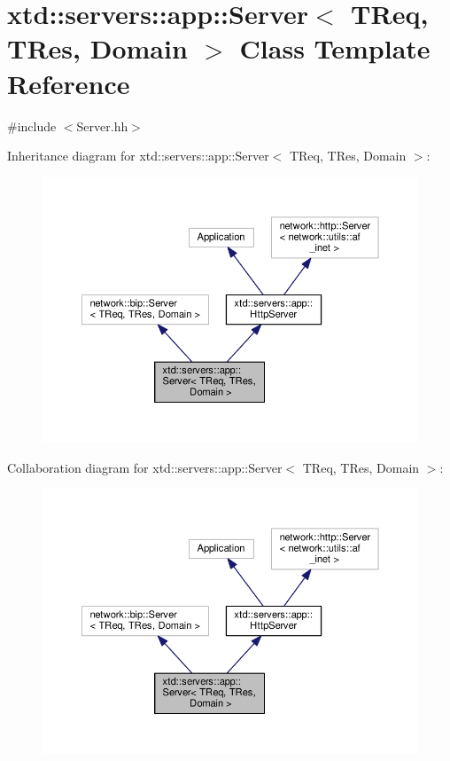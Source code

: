 \hypertarget{classxtd_1_1servers_1_1app_1_1Server}{\section{xtd\-:\-:servers\-:\-:app\-:\-:Server$<$ T\-Req, T\-Res, Domain $>$ Class Template Reference}
\label{classxtd_1_1servers_1_1app_1_1Server}
}


{\ttfamily \#include $<$Server.\-hh$>$}



Inheritance diagram for xtd\-:\-:servers\-:\-:app\-:\-:Server$<$ T\-Req, T\-Res, Domain $>$\-:
\nopagebreak
\begin{figure}[H]
\begin{center}
\leavevmode
\includegraphics[width=350pt]{classxtd_1_1servers_1_1app_1_1Server__inherit__graph}
\end{center}
\end{figure}


Collaboration diagram for xtd\-:\-:servers\-:\-:app\-:\-:Server$<$ T\-Req, T\-Res, Domain $>$\-:
\nopagebreak
\begin{figure}[H]
\begin{center}
\leavevmode
\includegraphics[width=350pt]{classxtd_1_1servers_1_1app_1_1Server__coll__graph}
\end{center}
\end{figure}

